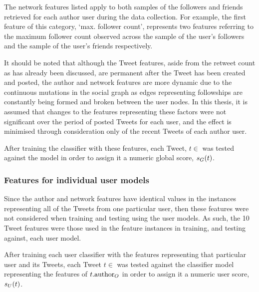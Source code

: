 The network features listed apply to both samples of the followers and friends retrieved for each author user during the data collection. For example, the first feature of this category, `max. follower count', represents two features referring to the maximum follower count observed across the sample of the user's followers and the sample of the user's friends respectively.

It should be noted that although the Tweet features, aside from the retweet count as has already been discussed, are permanent after the Tweet has been created and posted, the author and network features are more dynamic due to the continuous mutations in the social graph as edges representing followships are constantly being formed and broken between the user nodes. In this thesis, it is assumed that changes to the features representing these factors were not significant over the period of posted Tweets for each user, and the effect is minimised through consideration only of the recent Tweets of each author user.

After training the classifier with these features, each Tweet, $t \in$ \testset{} was tested against the model in order to assign it a numeric global score, $s_G(t)$.


\subsubsection{Features for individual user models}
Since the author and network features have identical values in the instances representing all of the Tweets from one particular user, then these features were not considered when training and testing using the user models. As such, the 10 Tweet features were those used in the feature instances in training, and testing against, each user model.

After training each user classifier with the features representing that particular user and its Tweets, each Tweet $t \in$ \testset{} was tested against the classifier model representing the features of $t.\textrm{author}_O$ in order to assign it a numeric user score, $s_U(t)$.  

